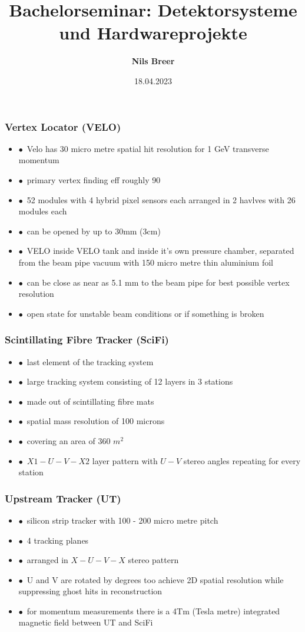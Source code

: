 \documentclass[aspectratio=1610, 12pt, xcolor=dvipsnames]{beamer}
\title{Bachelorseminar: Detektorsysteme und Hardwareprojekte}
\author[N.Breer]{\textbf{Nils Breer}}
\institute{TU Dortmund}
\date{18.04.2023}
\begin{document}
\maketitle

\begin{frame}\frametitle{Vertex Locator (VELO)}
  \begin{itemize}
    \item $\bullet$\, Velo has 30 micro metre spatial hit resolution for 1 GeV transverse momentum
    \item $\bullet$\, primary vertex finding eff roughly 90%
    \item $\bullet$\, 52 modules with 4 hybrid pixel sensors each arranged in 2 havlves with 26 modules each
    \item $\bullet$\, can be opened by up to 30mm (3cm)
    \item $\bullet$\, VELO inside VELO tank and inside it's own pressure chamber, separated from the beam pipe vacuum with 150 micro metre thin aluminium foil
    \item $\bullet$\, can be close as near as 5.1 mm to the beam pipe for best possible vertex resolution
    \item $\bullet$\, open state for unstable beam conditions or if something is broken
  \end{itemize}
\end{frame}

\begin{frame}\frametitle{Scintillating Fibre Tracker (SciFi)}
  \begin{itemize}
    \item $\bullet$\, last element of the tracking system
    \item $\bullet$\, large tracking system consisting of 12 layers in 3 stations
    \item $\bullet$\, made out of scintillating fibre mats
    \item $\bullet$\, spatial mass resolution of 100 microns
    \item $\bullet$\, covering an area of 360 $m^2$
    \item $\bullet$\, $X1-U-V-X2$ layer pattern with $U-V$ stereo angles repeating for every station
  \end{itemize}
\end{frame}

\begin{frame}\frametitle{Upstream Tracker (UT)}
  \begin{itemize}
    \item $\bullet$\, silicon strip tracker with 100 - 200 micro metre pitch
    \item $\bullet$\, 4 tracking planes
    \item $\bullet$\, arranged in $X-U-V-X$ stereo pattern
    \item $\bullet$\, U and V are rotated by  degrees too achieve 2D spatial resolution while suppressing ghost hits in reconstruction
    \item $\bullet$\, for momentum measurements there is a 4Tm (Tesla metre) integrated magnetic field between UT and SciFi
  \end{itemize}
\end{frame}
\end{document}

